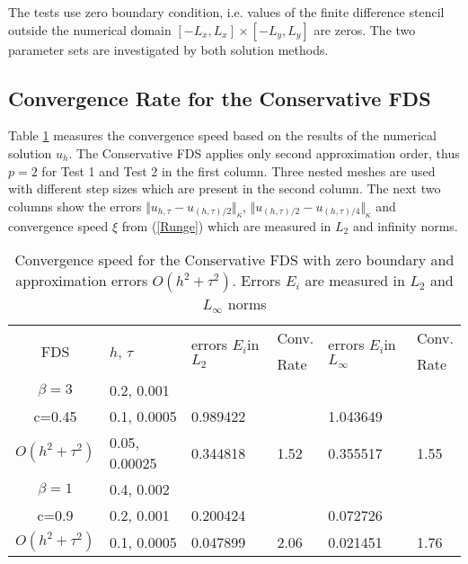 \documentclass[%
 aip,
cp,  %
 amsmath,amssymb,%
 reprint,%
]{revtex4-2}
\newcommand{\rf}[1]{(\ref{#1})}
\begin{document}
The tests use zero boundary condition, i.e. values of the finite difference stencil outside the numerical domain $[-L_x, L_x] \times [-L_y, L_y]$ are zeros. The two parameter sets are investigated by both solution methods. 

\subsection{Convergence Rate for the Conservative FDS}

Table \ref{tableC} measures the convergence speed based on the results of the numerical solution $u_h$. The Conservative FDS applies only second approximation order, thus $p=2$ for Test 1 and Test 2 in the first column. Three nested meshes are used with different step sizes which are present in the second column. The next two columns show the errors $\Vert u_{h,\tau} - u_{(h,\tau)/2} \Vert_\kappa$, $\Vert  u_{(h,\tau)/2} - u_{(h,\tau)/4} \Vert_\kappa$ and convergence speed $\xi$ from \rf{Runge} which are measured in $L_2$ and infinity norms. 
\begin{table}[ht]
\centering
\small
		\begin{tabular}{||c|l|ll|ll||}
			\hline
			\hline
      \multirow{2  }{*}{FDS}        & \multirow{2  }{*}{$h$, $\tau$}  & \multirow{2  }{*}{errors $E_i$in$L_2$}  &Conv.& \multirow{2  }{*}{errors $E_i$in$L_\infty$}  &Conv.  \\
	                                        &                                                     &                                                                 &  Rate &                                                                       & Rate \\
   			\hline 
					\hline 
  $\beta=3$                &0.2, 0.001         &                    &                &                  &                   \\
   c=0.45                     &0.1, 0.0005         & 0.989422   &                & 1.043649  &                   \\
     $O(h^2 + \tau^ 2)$ &0.05, 0.00025  &0.344818    & 1.52       & 0.355517   &   1.55   \\
	   \hline
			\hline 
       $\beta=1$           & 0.4, 0.002       &                   &           &                 &   \\
                  c=0.9       & 0.2, 0.001        & 0.200424   &          &0.072726  &   \\
  $O(h^2+ \tau^2)$  & 0.1, 0.0005       & 0.047899   & 2.06  &0.021451  & 1.76 \\
	   \hline
			\hline 
		\end{tabular}
		\caption{Convergence speed for the Conservative FDS with zero boundary and approximation errors $O(h^{2} + \tau^2 )$. Errors $E_i$ are measured in $L_2$ and $L_\infty$ norms}
\label{tableC}
\end{table}
\end{document}
